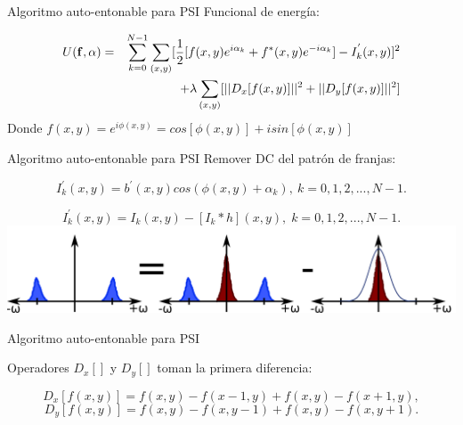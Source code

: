 \documentclass[]{beamer}
\begin{document}
\begin{frame}{Algoritmo auto-entonable para PSI}
Funcional de energ\'ia:
\begin{center}

\begin{eqnarray}
 U(\bf{f,\alpha}) & = &\sum_{k=0}^{N-1}
\sum_{(x,y)}[\frac{1}{2}[f(x,y)e^{i\alpha_{k}}+f^{*}(x,y)e^{-i\alpha_{k}}]-I_{k}
^{'}(x,y)]^{2}\label{eq:U}\nonumber \\
 &  & +\lambda\sum_{(x,y)}[||D_{x}[f(x,y)]||^{2}+||D_{y}[f(x,y)]||^{2}] 
\end{eqnarray}
Donde $f(x,y)=e^{i\phi(x,y)}=cos[\phi(x,y)]+i sin[\phi(x,y)]$

\end{center}
\end{frame}
\begin{frame}{Algoritmo auto-entonable para PSI}
Remover DC del patr\'on de franjas:
\begin{center}

\begin{equation}
I_{k}^{'}(x,y)=b^{'}(x,y)cos(\phi(x,y)+\alpha_{k}),\: k=0,1,2,...,N-1.
\end{equation}

\begin{equation}
I_{k}^{'}(x,y)=I_{k}(x,y)-[I_{k}*h](x,y),\; k=0,1,2,...,N-1.
\end{equation}
\includegraphics[scale=0.1]{Images/QuitarDC.png}


\end{center}
\end{frame}
\begin{frame}{Algoritmo auto-entonable para PSI}

Operadores $D_x[]$ y $D_y[]$ toman la primera diferencia:
\begin{center}

\begin{equation}
D_{x}[f(x,y)]=f(x,y)-f(x-1,y)+f(x,y)-f(x+1,y),
\end{equation}
\begin{equation}
D_{y}[f(x,y)]=f(x,y)-f(x,y-1)+f(x,y)-f(x,y+1).
\end{equation}

\end{center}
\end{frame}
\end{document}
